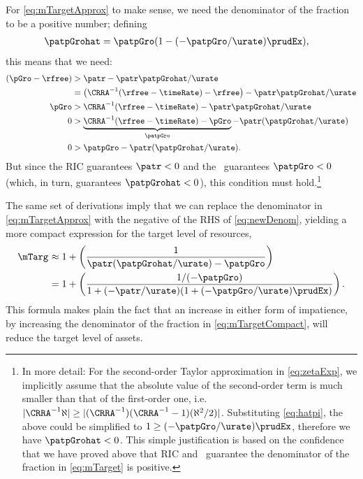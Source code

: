 \documentclass{\handout}
\begin{document}
For \eqref{eq:mTargetApprox} to make sense, we need
the denominator of the fraction to be a positive number;
defining
\begin{equation}\begin{gathered}\begin{aligned}
  \patpGrohat & =  \patpGro(1-(-\patpGro/\urate)\prudEx),
\end{aligned}\end{gathered}\end{equation}
this means that we need:
\begin{equation}\begin{gathered}\begin{aligned}
    (\pGro - \rfree) & >  \patr - \patr\patpGrohat/\urate
\\   & =  \left(\CRRA^{-1}(\rfree-\timeRate)-\rfree\right)-  \patr\patpGrohat/\urate
\\ \pGro & >  \CRRA^{-1}(\rfree-\timeRate)-  \patr\patpGrohat/\urate
\\ 0 & >  \underbrace{\CRRA^{-1}(\rfree-\timeRate) - \pGro}_{\patpGro} -  \patr(\patpGrohat/\urate)
\\ 0 & >  \patpGro -  \patr(\patpGrohat/\urate) \label{eq:newDenom}
.
\end{aligned}\end{gathered}\end{equation}
But since the RIC guarantees $\patr<0$ and the \GICPGro~guarantees $\patpGro<0$ (which, in turn, guarantees $\patpGrohat < 0$), this condition must hold.\footnote{In more detail: For the second-order Taylor approximation in \eqref{eq:zetaExp}, we implicitly assume that the absolute value of the second-order term is much smaller than that of the first-order one, i.e. $|\CRRA^{-1} \aleph | \geq |(\CRRA^{-1})(\CRRA^{-1}-1)(\aleph^{2}/2)|$. Substituting \eqref{eq:hatpi}, the above could be simplified to $1 \geq (-\patpGro/\urate)\prudEx$, therefore we have $\patpGrohat < 0$. This simple justification is based on the confidence that we have proved above that RIC and \GICPGro~guarantee the denominator of the fraction in \eqref{eq:mTarget} is positive.}

The same set of derivations imply that we can
replace the denominator in \eqref{eq:mTargetApprox} with the negative
of the RHS of \eqref{eq:newDenom}, yielding a more compact expression
for the target level of resources,
\begin{equation}\begin{gathered}\begin{aligned}
 \mTarg^{\null} & \approx  1 + \left(\frac{1}{\patr(\patpGrohat/\urate) - \patpGro }\right)
\\ & =  1 + \left(\frac{1/(-\patpGro)}{1+(-\patr/\urate)(1+(-\patpGro/\urate)\prudEx)  }\right) \label{eq:mTargetCompact}
.
\end{aligned}\end{gathered}\end{equation}
This formula makes plain the fact that an
increase in either form of impatience, by increasing the denominator of the 
fraction in 
\eqref{eq:mTargetCompact}, will reduce the target level of assets.
\end{document}
